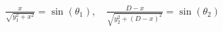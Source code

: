 \documentclass[preview]{standalone}
\begin{document}
\begin{align*}
\frac{x}{\sqrt{y_1^2 + x^2}} = \sin(\theta_1), \quad \frac{D-x}{\sqrt{y_2^2 + (D-x)^2}} = \sin(\theta_2)
\end{align*}
\end{document}
